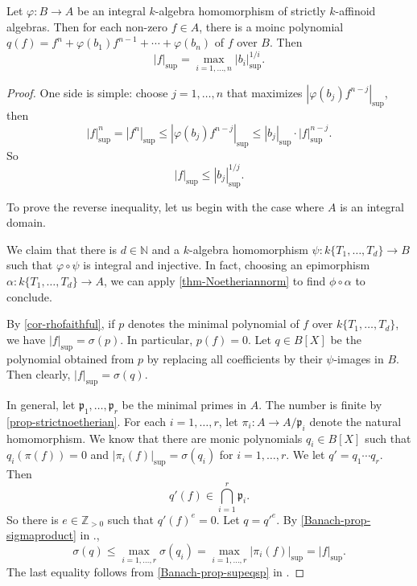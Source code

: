 \begin{proposition}\label{prop-integralstrictafffsup}
    Let $\varphi:B\rightarrow A$ be an integral $k$-algebra homomorphism of strictly $k$-affinoid algebras. Then for each non-zero $f\in A$, there is a moinc polynomial $q(f)=f^n+\varphi(b_1)f^{n-1}+\cdots+\varphi(b_n)$ of $f$ over $B$. Then 
    \[
        |f|_{\sup}=\max_{i=1,\ldots,n}|b_i|_{\sup}^{1/i}.  
    \]
\end{proposition}
\begin{proof}
    One side is simple: choose $j=1,\ldots,n$ that maximizes $|\varphi(b_j)f^{n-j}|_{\sup}$, then
    \[
        |f|_{\sup}^n=|f^n|_{\sup}\leq  |\varphi(b_j)f^{n-j}|_{\sup}\leq |b_j|_{\sup}\cdot |f|_{\sup}^{n-j}.
    \]
    So
    \[
        |f|_{\sup}\leq |b_j|_{\sup}^{1/j}.  
    \]

    To prove the reverse inequality, let us begin with the case where $A$ is an integral domain. 
    
    We claim that there is $d\in \mathbb{N}$ and a $k$-algebra homomorphism $\psi:k\{T_1,\ldots,T_d\}\rightarrow B$ such that $\varphi\circ \psi$ is integral and injective.  In fact, choosing an epimorphism $\alpha:k\{T_1,\ldots,T_d\}\rightarrow A$, we can apply \cref{thm-Noetheriannorm} to find $\phi\circ \alpha$ to conclude.

    By \cref{cor-rhofaithful}, if $p$ denotes the minimal polynomial of $f$ over $k\{T_1,\ldots,T_d\}$, we have $|f|_{\sup}=\sigma(p)$. In particular, $p(f)=0$. Let $q\in B[X]$ be the polynomial obtained from $p$ by replacing all coefficients by their $\psi$-images in $B$. Then clearly, $|f|_{\sup}=\sigma(q)$.

    In general, let $\mathfrak{p}_1,\ldots,\mathfrak{p}_r$ be the minimal primes in $A$. The number is finite by \cref{prop-strictnoetherian}. For each $i=1,\ldots,r$, let $\pi_i:A\rightarrow A/\mathfrak{p}_i$ denote the natural homomorphism. We know that there are monic polynomials $q_i\in B[X]$ such that $q_i(\pi(f))=0$ and $|\pi_i(f)|_{\sup}=\sigma(q_i)$ for $i=1,\ldots,r$. We let $q'=q_1\cdots q_r$. Then 
    \[
        q'(f)\in \bigcap_{i=1}^r\mathfrak{p}_i.
    \]
    So there is $e\in \mathbb{Z}_{>0}$ such that $q'(f)^e=0$. Let $q=q'^e$. By \cref{Banach-prop-sigmaproduct} in .,
    \[
        \sigma(q)\leq  \max_{i=1,\ldots,r}\sigma(q_i) =\max_{i=1,\ldots,r} |\pi_i(f)|_{\sup}=|f|_{\sup}.
    \]
    The last equality follows from \cref{Banach-prop-supeqsp} in .
\end{proof}

